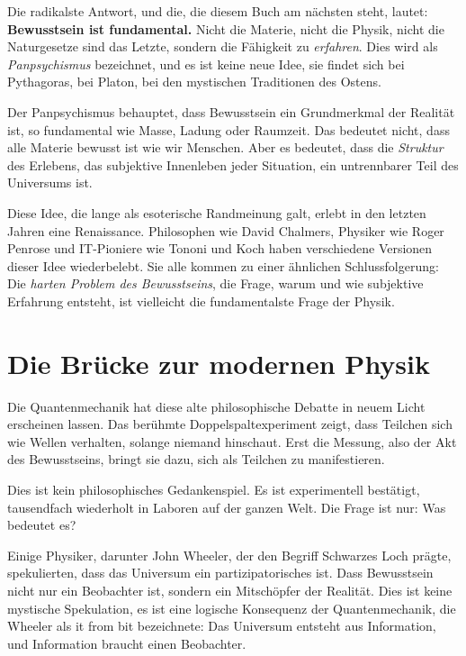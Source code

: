 Die radikalste Antwort, und die, die diesem Buch am nächsten steht, lautet: \textbf{Bewusstsein ist fundamental.} Nicht die Materie, nicht die Physik, nicht die Naturgesetze sind das Letzte, sondern die Fähigkeit zu \emph{erfahren}. Dies wird als \emph{Panpsychismus} bezeichnet, und es ist keine neue Idee, sie findet sich bei Pythagoras, bei Platon, bei den mystischen Traditionen des Ostens.

Der Panpsychismus behauptet, dass Bewusstsein ein Grundmerkmal der Realität ist, so fundamental wie Masse, Ladung oder Raumzeit. Das bedeutet nicht, dass alle Materie bewusst ist wie wir Menschen. Aber es bedeutet, dass die \emph{Struktur} des Erlebens, das subjektive Innenleben jeder Situation, ein untrennbarer Teil des Universums ist.

Diese Idee, die lange als esoterische Randmeinung galt, erlebt in den letzten Jahren eine Renaissance. Philosophen wie David Chalmers, Physiker wie Roger Penrose und IT-Pioniere wie Tononi und Koch haben verschiedene Versionen dieser Idee wiederbelebt. Sie alle kommen zu einer ähnlichen Schlussfolgerung: Die \emph{harten Problem des Bewusstseins}, die Frage, warum und wie subjektive Erfahrung entsteht, ist vielleicht die fundamentalste Frage der Physik.

\section{Die Brücke zur modernen Physik}

Die Quantenmechanik hat diese alte philosophische Debatte in neuem Licht erscheinen lassen. Das berühmte Doppelspaltexperiment zeigt, dass Teilchen sich wie Wellen verhalten, solange niemand hinschaut. Erst die Messung, also der Akt des Bewusstseins, bringt sie dazu, sich als Teilchen zu manifestieren.

Dies ist kein philosophisches Gedankenspiel. Es ist experimentell bestätigt, tausendfach wiederholt in Laboren auf der ganzen Welt. Die Frage ist nur: Was bedeutet es?

Einige Physiker, darunter John Wheeler, der den Begriff \glqq Schwarzes Loch\grqq{} prägte, spekulierten, dass das Universum ein \glqq partizipatorisches\grqq{} ist. Dass Bewusstsein nicht nur ein Beobachter ist, sondern ein Mitschöpfer der Realität. Dies ist keine mystische Spekulation, es ist eine logische Konsequenz der Quantenmechanik, die Wheeler als \glqq it from bit\grqq{} bezeichnete: Das Universum entsteht aus Information, und Information braucht einen Beobachter.

